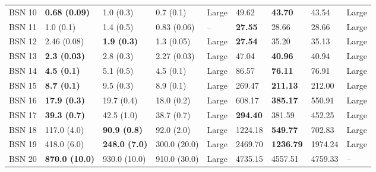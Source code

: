 \begin{tabular}{lllllllll}
BSN 10 &  \textbf{0.68 (0.09)} &             1.0 (0.3) &          0.7 (0.1) &       Large &                   49.62 &              \textbf{43.70} &                    43.54 &       Large \\
BSN 11 &             1.0 (0.1) &             1.4 (0.5) &        0.83 (0.06) &          -- &          \textbf{27.55} &                       28.66 &                    28.66 &       Large \\
BSN 12 &           2.46 (0.08) &    \textbf{1.9 (0.3)} &         1.3 (0.05) &       Large &          \textbf{27.54} &                       35.20 &                    35.13 &       Large \\
BSN 13 &   \textbf{2.3 (0.03)} &             2.8 (0.3) &        2.27 (0.03) &       Large &                   47.04 &              \textbf{40.96} &                    40.94 &       Large \\
BSN 14 &    \textbf{4.5 (0.1)} &             5.1 (0.5) &          4.5 (0.1) &       Large &                   86.57 &              \textbf{76.11} &                    76.91 &       Large \\
BSN 15 &    \textbf{8.7 (0.1)} &             9.5 (0.3) &          8.9 (0.1) &       Large &                  269.47 &             \textbf{211.13} &                   212.00 &       Large \\
BSN 16 &   \textbf{17.9 (0.3)} &            19.7 (0.4) &         18.0 (0.2) &       Large &                  608.17 &             \textbf{385.17} &                   550.91 &       Large \\
BSN 17 &   \textbf{39.3 (0.7)} &            42.5 (1.0) &         38.7 (0.7) &       Large &         \textbf{294.40} &                      381.59 &                   452.25 &       Large \\
BSN 18 &           117.0 (4.0) &   \textbf{90.9 (0.8)} &         92.0 (2.0) &       Large &                 1224.18 &             \textbf{549.77} &                   702.83 &       Large \\
BSN 19 &           418.0 (6.0) &  \textbf{248.0 (7.0)} &       300.0 (20.0) &       Large &                 2469.70 &            \textbf{1236.79} &                  1974.24 &       Large \\
BSN 20 & \textbf{870.0 (10.0)} &          930.0 (10.0) &       910.0 (30.0) &       Large &                 4735.15 &                     4557.51 &                  4759.33 &          -- \\
\bottomrule
\end{tabular}
